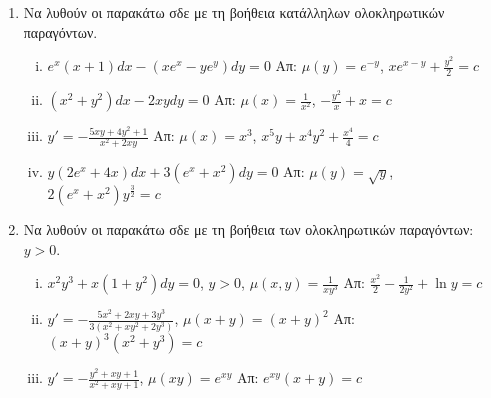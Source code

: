 \begin{enumerate}
\begin{enumerate}[i)]
	\end{enumerate}

\item Να λυθούν οι παρακάτω σδε με τη βοήθεια κατάλληλων ολοκληρωτικών παραγόντων.
	
	\begin{enumerate}[i)]
		\item $ e^{x}(x+1)dx - (xe^{x}-ye^{y})dy = 0 $ \hfill Απ: $ \mu(y) = e^{-y} $, $xe^{x-y} +
			\frac{y^{2}}{2} = c $
		\item $ (x^{2}+y^{2})dx - 2xydy = 0 $ \hfill Απ: $ \mu(x)= \frac{1}{x^{2}} $, $ -
			\frac{y^{2}}{x} + x = c $
		\item $ y' =- \frac{5xy+4y^{2}+1}{x^{2}+2xy} $ \hfill Απ: $ \mu(x)=x^{3} $, $
			x^{5}y+x^{4}y^{2} + \frac{x^{4}}{4} = c $ 
		\item $ y(2e^{x}+4x)dx + 3(e^{x}+x^{2})dy = 0 $ \hfill Απ: $ \mu(y)= \sqrt{ y } $, $
			2(e^{x}+x^{2})y^{\frac{3}{2}}=c $ 
	\end{enumerate}

\item Να λυθούν οι παρακάτω σδε με τη βοήθεια των ολοκληρωτικών παραγόντων: $ y>0 $. 


\begin{enumerate}[i)]
	\item $ x^{2}y^{3}+x(1+y^{2})dy=0 $, $ y>0 $, \quad $ \mu(x,y)= \frac{1}{xy^{3}} $ \hfill Απ: $ \frac{x^{2}}{2} - \frac{1}{2y^{2}} + \ln{y} = c $ 
	\item $ y'=- \frac{5x^{2}+2xy+3y^{3}}{3(x^{2}+xy^{2}+2y^{3})} $, \quad $ \mu(x+y) = (x+y)^{2}
		$ \hfill Απ: $ (x+y)^{3}(x^{2}+y^{3}) = c $ 
	\item $ y' = -\frac{y^{2}+xy+1}{x^{2}+xy+1} $, \quad $ \mu(xy) = e^{xy} $ \hfill Απ: $
		e^{xy}(x+y)=c $ 
	\end{enumerate}


\end{enumerate}


